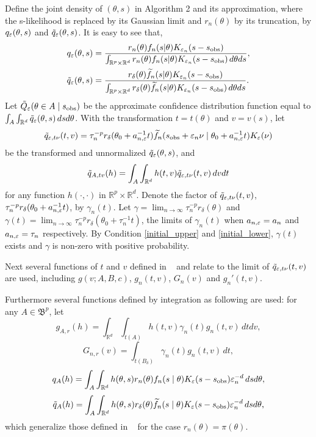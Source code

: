 \documentclass{article}
\begin{document}
\pagebreak 

Define the joint density of $(\theta,s)$ in Algorithm 2
and its approximation, where the s-likelihood is replaced by its Gaussian
limit and $r_{n}(\theta)$ by its truncation, by $q_{\varepsilon}(\theta,s)$
and $\tilde{q}_{\varepsilon}(\theta,s)$. It is easy to see that,
\begin{align*}
q_{\varepsilon}(\theta,s) & =\frac{r_{n}(\theta)f_{n}(s|\theta)K_{\varepsilon_{n}}(s-s_{\rm obs})}{\int_{\mathbb{R}^{p}\times\mathbb{R}^{d}}r_{n}(\theta)f_{n}(s|\theta)K_{\varepsilon_{n}}(s-s_{\rm obs})\,d\theta ds},\\
\tilde{q}_{\varepsilon}(\theta,s) & =\frac{r_{\delta}(\theta)\widetilde{f}_{n}(s|\theta)K_{\varepsilon_{n}}(s-s_{\rm obs})}{\int_{\mathbb{R}^{p}\times\mathbb{R}^{d}}r_{\delta}(\theta)\widetilde{f}_{n}(s|\theta)K_{\varepsilon_{n}}(s-s_{\rm obs})\,d\theta ds}.
\end{align*}
Let $\tilde{Q}_{\varepsilon}(\theta\in A\mid s_{\rm obs})$ be the approximate confidence distribution function equal to $\int_{A}\int_{\mathbb{R}^{d}}\tilde{q}_{\varepsilon}(\theta,s)\,dsd\theta$.
With the transformation $t=t(\theta)$ and $v=v(s)$, let $$\tilde{q}_{\varepsilon,t\nu}(t,v)=\tau_{n}^{-p}r_{\delta}(\theta_0+a_{n,\varepsilon}^{-1}t)\widetilde{f}_{n}(s_{\rm obs}+\varepsilon_{n}\nu\mid\theta_0+a_{n,\varepsilon}^{-1}t)K_{\varepsilon}(\nu)$$
be the transformed and unnormalized $\tilde{q}_{\varepsilon}(\theta,s)$, and
$$\tilde{q}_{A,tv}(h)=\int_{A}\int_{\mathbb{R}^{d}}h(t,v)\tilde{q}_{\varepsilon,t\nu}(t,v)\,dvdt$$
for any function $h(\cdot,\cdot)$ in $\mathbb{R}^{p}\times\mathbb{R}^{d}$.
Denote the factor of $\tilde{q}_{\varepsilon,t\nu}(t,v)$, $\tau_{n}^{-p}r_{\delta}(\theta_0+a_{n,\varepsilon}^{-1}t)$,
by $\gamma_{n}(t)$. Let $\gamma=\lim_{n\rightarrow\infty}\tau_{n}^{-p}r_{\delta}(\theta)$
and $\gamma(t)=\lim_{n\rightarrow\infty}\tau_{n}^{-p}r_{\delta}(\theta_0+\tau_{n}^{-1}t)$,
the limits of $\gamma_{n}(t)$ when $a_{n,\varepsilon}=a_{n}$ and
$a_{n,\varepsilon}=\tau_{n}$ respectively. By Condition \ref{initial_upper} and \ref{initial_lower},
$\gamma(t)$ exists and $\gamma$ is non-zero with positive probability.


Next several functions of $t$ and $v$ defined in ~\cite[proofs for Section 3.1]{Li2017}
and relate to the limit of $\tilde{q}_{\varepsilon,t\nu}(t,v)$ are used, including
$g(v;A,B,c)$, $g_{n}(t,v)$, $G_{n}(v)$ and $g_{n}'(t,v)$. 

Furthermore
several functions defined by integration as following are used: for
any $A\in\mathfrak{B}^{p}$, let $$g_{A,r}(h)=\int_{\mathbb{R}^{d}}\int_{t(A)}h(t,v)\gamma_{n}(t)g_{n}(t,v)\,dtdv,$$
$$G_{n,r}(v)=\int_{t(B_{\delta})}\gamma_{n}(t)g_{n}(t,v)\,dt,$$ 
$$q_{A}(h)=\int_{A}\int_{\mathbb{R}^{d}}h(\theta,s)r_{n}(\theta)f_{n}(s\mid\theta)K_{\varepsilon}(s-s_{\rm obs})\varepsilon_{n}^{-d}\,dsd\theta,$$
$$\tilde{q}_{A}(h)=\int_{A}\int_{\mathbb{R}^{d}}h(\theta,s)r_{\delta}(\theta)\widetilde{f}_{n}(s\mid\theta)K_{\varepsilon}(s-s_{\rm obs})\varepsilon_{n}^{-d}\,dsd\theta,$$
which generalize those defined in ~\cite[proofs for Section 3.1]{Li2017}
for the case $r_{n}(\theta)=\pi(\theta)$. 
\end{document}
